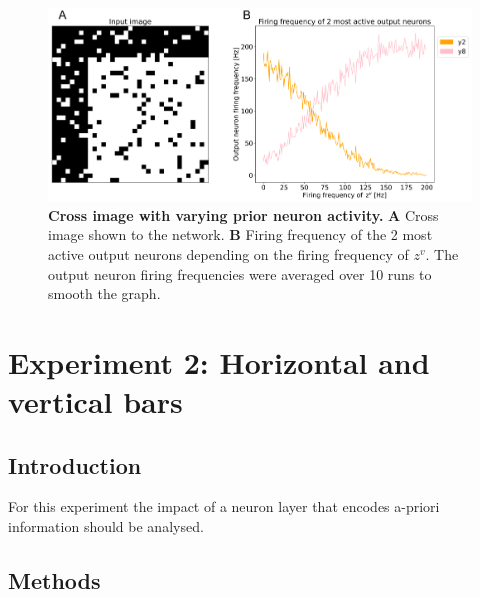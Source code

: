 \begin{figure}
  \includegraphics[width=\linewidth]{figures/horvertAdaptiveInh/YFrequency_prior.png}
  \caption{\textbf{Cross image with varying prior neuron activity.} \textbf{A} Cross image shown to the network. \textbf{B} Firing frequency of the 2 most active output neurons depending on the firing frequency of $z^v$. The output neuron firing frequencies were averaged over 10 runs to smooth the graph. }
  \label{fig:horvertAdaptiveInhibitionVariablePriorResults}
\end{figure}






























\iffalse
\section{Experiment 2: Horizontal and vertical bars}
\label{section:horvert}

 \subsection{Introduction}

For this experiment the impact of a neuron layer that encodes a-priori information should be analysed.

\subsection{Methods}

